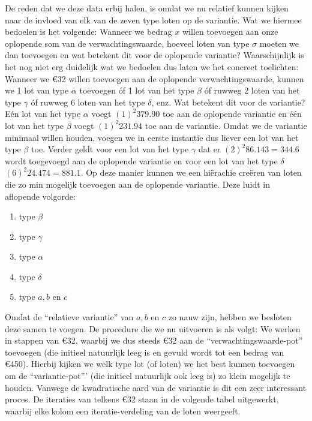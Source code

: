 De reden dat we deze data erbij halen, is omdat we nu relatief kunnen kijken naar de invloed van elk van de zeven type loten op de variantie. Wat we hiermee bedoelen is het volgende: Wanneer we bedrag $x$ willen toevoegen aan onze oplopende som van de verwachtingswaarde, hoeveel loten van type $\sigma$ moeten we dan toevoegen en wat betekent dit voor de oplopende variantie? Waarschijnlijk is het nog niet erg duidelijk wat we bedoelen dus laten we het concreet toelichten:\\

Wanneer we \euro32 willen toevoegen aan de oplopende verwachtingswaarde, kunnen we 1 lot van type $\alpha$ toevoegen óf 1 lot van het type $\beta$ óf ruwweg 2 loten van het type $\gamma$ óf ruwweg 6 loten van het type $\delta$, enz. Wat betekent dit voor de variantie? Eén lot van het type $\alpha$ voegt $(1)^{2}379.90$ toe aan de oplopende variantie en één lot van het type $\beta$ voegt $(1)^{2}231.94$ toe aan de variantie. Omdat we de variantie minimaal willen houden, voegen we in eerste instantie dus liever een lot van het type $\beta$ toe. Verder geldt voor een lot van het type $\gamma$ dat er $(2)^{2}86.143=344.6$ wordt toegevoegd aan de oplopende variantie en voor een lot van het type $\delta$ $(6)^{2}24.474=881.1$. Op deze manier kunnen we een hi\"erachie cre\"eren van loten die zo min mogelijk toevoegen aan de oplopende variantie. Deze luidt in aflopende volgorde:

\begin{enumerate}
\item{type $\beta$}
\item{type $\gamma$}
\item{type $\alpha$}
\item{type $\delta$}
\item{type $a,b$ en $c$}
\end{enumerate}

Omdat de ``relatieve variantie'' van $a,b$ en $c$ zo nauw zijn, hebben we besloten deze samen te voegen. De procedure die we nu uitvoeren is als volgt: We werken in stappen van \euro32, waarbij we dus steeds \euro32 aan de ``verwachtingswaarde-pot'' toevoegen (die initieel natuurlijk leeg is en gevuld wordt tot een bedrag van \euro450). Hierbij kijken we welk type lot (of loten) we het best kunnen toevoegen om de ``variantie-pot''' (die initieel natuurlijk ook leeg is) zo klein mogelijk te houden. Vanwege de kwadratische aard van de variantie is dit een zeer interessant proces. De iteraties van telkens \euro32 staan in de volgende tabel uitgewerkt, waarbij elke kolom een iteratie-verdeling van de loten weergeeft.  \\
\\

